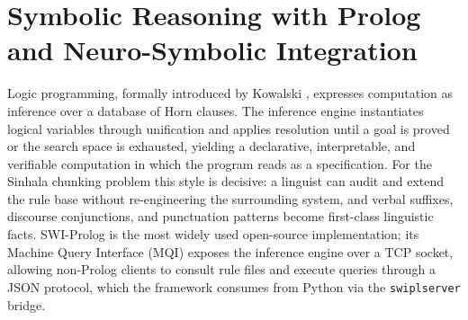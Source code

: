 \documentclass[12pt,a4paper,oneside]{report}
\begin{document}
\section{Symbolic Reasoning with Prolog and Neuro-Symbolic Integration}
\label{sec:tech-prolog}
Logic programming, formally introduced by Kowalski \cite{kowalski1974predicate}, expresses computation as inference over a database of Horn clauses. The inference engine instantiates logical variables through unification and applies resolution until a goal is proved or the search space is exhausted, yielding a declarative, interpretable, and verifiable computation in which the program reads as a specification. For the Sinhala chunking problem this style is decisive: a linguist can audit and extend the rule base without re-engineering the surrounding system, and verbal suffixes, discourse conjunctions, and punctuation patterns become first-class linguistic facts. SWI-Prolog \cite{wielemaker2012swiprolog} is the most widely used open-source implementation; its Machine Query Interface (MQI) exposes the inference engine over a TCP socket, allowing non-Prolog clients to consult rule files and execute queries through a JSON protocol, which the framework consumes from Python via the \texttt{swiplserver} bridge.
\end{document}
